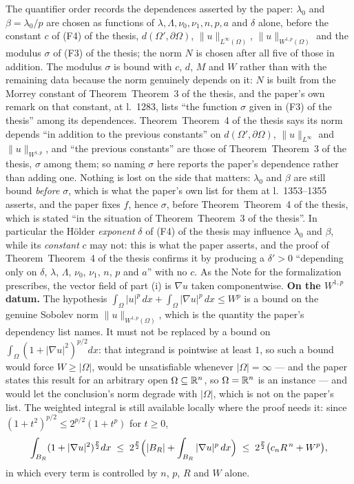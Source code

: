 \begin{theorem}[Theorem 4]
\begin{itemize}
\end{itemize}
The quantifier order records the dependences asserted by the paper: $\lambda_0$
and $\beta=\lambda_0/p$ are chosen as functions of
$\lambda,\Lambda,\nu_0,\nu_1,n,p,a$ and $\delta$ alone, before the constant $c$
of (F4) of the thesis, $d(\Omega',\partial\Omega)$, $\|u\|_{L^\infty(\Omega)}$,
$\|u\|_{W^{1,p}(\Omega)}$ and the modulus $\sigma$ of (F3) of the thesis; the norm
$N$ is chosen after all five of those in addition.  The modulus $\sigma$ is
bound with $c$, $d$, $M$ and $W$ rather than with the remaining data because the
norm genuinely depends on it: $N$ is built from the Morrey constant of
Theorem~Theorem~3 of the thesis, and the paper's own remark on that constant, at l.~1283,
lists ``the function $\sigma$ given in (F3) of the thesis'' among its dependences.
Theorem~Theorem~4 of the thesis says its norm depends ``in addition to the previous
constants'' on $d(\Omega',\partial\Omega)$, $\|u\|_{L^\infty}$ and
$\|u\|_{W^{1,p}}$, and ``the previous constants'' are those of
Theorem~Theorem~3 of the thesis, $\sigma$ among them; so naming $\sigma$ here reports the
paper's dependence rather than adding one.  Nothing is lost on the side that matters:
$\lambda_0$ and $\beta$ are still bound \emph{before} $\sigma$, which is what
the paper's own list for them at l.~1353--1355 asserts, and the paper fixes $f$,
hence $\sigma$, before Theorem~Theorem~4 of the thesis, which is stated ``in the situation
of Theorem~Theorem~3 of the thesis''.  In particular the H\"older \emph{exponent} $\delta$ of (F4) of the thesis
may influence $\lambda_0$ and $\beta$, while its \emph{constant} $c$ may not:
this is what the paper asserts, and the proof of Theorem~Theorem~4 of the thesis confirms it
by producing a $\delta'>0$ ``depending only on $\delta$, $\lambda$, $\Lambda$,
$\nu_0$, $\nu_1$, $n$, $p$ and $a$'' with no $c$.  As the Note for the
formalization prescribes, the vector field of part (i) is $\nabla u$ taken
componentwise.
\noindent\textbf{On the $W^{1,p}$ datum.}  The hypothesis
$\int_\Omega|u|^p\,dx+\int_\Omega|\nabla u|^p\,dx\le W^p$ is a bound on the
genuine Sobolev norm $\|u\|_{W^{1,p}(\Omega)}$, which is the quantity the
paper's dependency list names.  It must not be replaced by a bound on
$\int_\Omega(1+|\nabla u|^2)^{p/2}dx$: that integrand is pointwise at least $1$,
so such a bound would force $W\ge|\Omega|$, would be unsatisfiable whenever
$|\Omega|=\infty$ --- and the paper states this result for an arbitrary open
$\Omega\subseteq\mathbb{R}^n$, so $\Omega=\mathbb{R}^n$ is an instance --- and would let the
conclusion's norm degrade with $|\Omega|$, which is not on the paper's list.
The weighted integral is still available locally where the proof needs it: since
$(1+t^2)^{p/2}\le2^{p/2}(1+t^p)$ for $t\ge0$,
\[
\int_{B_R}(1+|\nabla u|^2)^{\frac p2}dx
\;\le\;2^{\frac p2}\Bigl(|B_R|+\int_{B_R}|\nabla u|^p\,dx\Bigr)
\;\le\;2^{\frac p2}\bigl(c_nR^{\,n}+W^p\bigr),
\]
in which every term is controlled by $n$, $p$, $R$ and $W$ alone.


\end{theorem}
